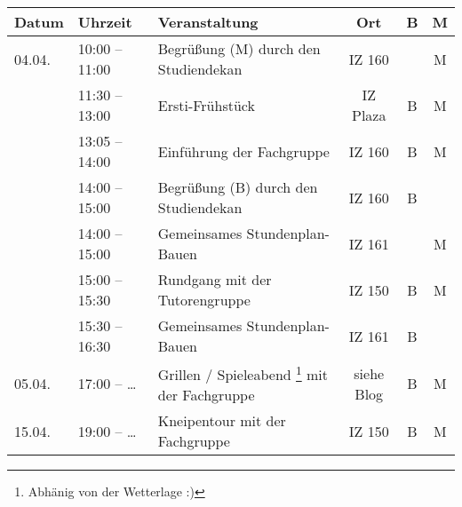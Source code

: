 
\begin{tabular}{|l|l|p{6.7cm}|c|c|c|}
\hline \textbf{Datum} & \textbf{Uhrzeit} & \textbf{Veranstaltung}	& \textbf{Ort} & \textbf{B} & \textbf{M} \\
\hline 04.04.  	& 10:00 – 11:00	 & Begrüßung (M) \newline durch den Studiendekan	& IZ 160	& &M\\
\hline 	& 11:30 – 13:00	 & Ersti-Frühstück									& IZ Plaza		&B&M\\
\hline 			& 13:05 – 14:00	 & Einführung  der Fachgruppe					& IZ 160		&B&M\\
\hline 			& 14:00 – 15:00	 & Begrüßung (B) \newline durch den Studiendekan	& IZ 160	&B& \\
\hline 			& 14:00 – 15:00	 & Gemeinsames Stundenplan-Bauen					& IZ 161		& &M\\
%
%
\hline 			& 15:00 – 15:30	 & Rundgang  \newline mit der Tutorengruppe		& IZ 150		&B&M \\
\hline 			& 15:30 – 16:30	 & Gemeinsames Stundenplan-Bauen					& IZ 161		& B&\\
\hline 	05.04.		& 17:00 – \ldots & Grillen / Spieleabend
\footnote{Abhänig von der Wetterlage :)} mit der Fachgruppe
& siehe Blog		&B&M\\
\hline 15.04.	& 19:00 – \ldots & Kneipentour mit der Fachgruppe					& IZ 150		&B&M\\
\hline
\end{tabular} 
